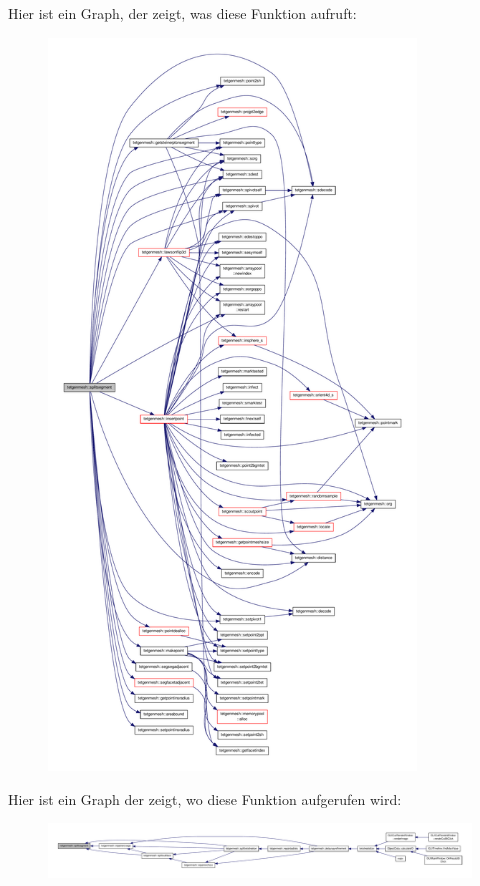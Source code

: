 Hier ist ein Graph, der zeigt, was diese Funktion aufruft\-:
\nopagebreak
\begin{figure}[H]
\begin{center}
\leavevmode
\includegraphics[height=550pt]{classtetgenmesh_a6394d7b4d386e8d08077c39cd8983e0e_cgraph}
\end{center}
\end{figure}




Hier ist ein Graph der zeigt, wo diese Funktion aufgerufen wird\-:
\nopagebreak
\begin{figure}[H]
\begin{center}
\leavevmode
\includegraphics[width=350pt]{classtetgenmesh_a6394d7b4d386e8d08077c39cd8983e0e_icgraph}
\end{center}
\end{figure}


